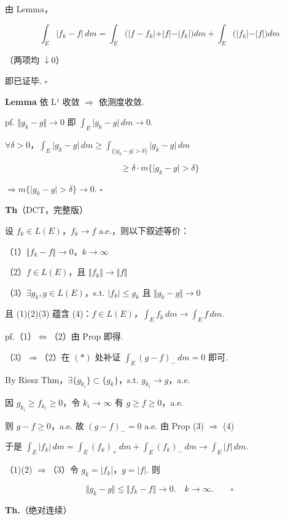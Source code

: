 \documentclass[11pt]{ctexart}
\theoremstyle{definition}
\begin{document}
由 Lemma，

\[
\int_E \vert f_k - f\vert \, dm = \int_E \big(\vert f - f_k\vert + \vert f\vert - \vert f_k\vert\big) dm + \int_E \big(\vert f_k\vert - \vert f\vert\big) dm
\]

（两项均 $\downarrow 0$）

即已证毕. $\square$

\textbf{Lemma} 依 L¹ 收敛 $\Rightarrow$ 依测度收敛.

pf. $\Vert g_k - g\Vert \to 0$ 即 $\displaystyle\int_E \vert g_k - g\vert \, dm \to 0$.

$\forall \delta > 0$，$\displaystyle\int_E \vert g_k - g\vert \, dm \geq \int_{\{\vert g_k - g\vert > \delta\}} \vert g_k - g\vert \, dm$

\[
\geq \delta \cdot m\{\vert g_k - g\vert > \delta\}
\]

$\Rightarrow m\{\vert g_k - g\vert > \delta\} \to 0$. $\square$

\textbf{Th}（DCT，完整版）

设 $f_k \in L(E)$，$f_k \to f$ a.e.，则以下叙述等价：

（1）$\Vert f_k - f\Vert \to 0$，$k \to \infty$

（2）$f \in L(E)$，且 $\Vert f_k\Vert \to \Vert f\Vert$

（3）$\exists g_k, g \in L(E)$，s.t. $\vert f_k\vert \leq g_k$ 且 $\Vert g_k - g\Vert \to 0$

且 (1)(2)(3) 蕴含 (4)：$f \in L(E)$，$\displaystyle\int_E f_k \, dm \to \int_E f \, dm$.

pf.（1）$\iff$（2）由 Prop 即得.

（3）$\Rightarrow$（2）在 $(\ast)$ 处补证 $\int_E (g - f)_- \, dm = 0$ 即可.

By Riesz Thm，$\exists \{g_{k_i}\} \subset \{g_k\}$，s.t. $g_{k_i} \to g$，a.e.

因 $g_{k_i} \geq f_{k_i} \geq 0$，令 $k_i \to \infty$ 有 $g \geq f \geq 0$，a.e.

则 $g - f \geq 0$，a.e. 故 $(g - f)_- = 0$ a.e. 由 Prop (3) $\Rightarrow$ (4)

于是 $\displaystyle\int_E \vert f_k\vert \, dm = \int_E (f_k)_+ \, dm + \int_E (f_k)_- \, dm \to \int_E \vert f\vert \, dm$.

（1)(2) $\Rightarrow$（3）令 $g_k = \vert f_k\vert$，$g = \vert f\vert$. 则

\[
\Vert g_k - g\Vert \leq \Vert f_k - f\Vert \to 0. \quad k \to \infty. \qquad \square
\]

\textbf{Th.}（绝对连续）
\end{document}
